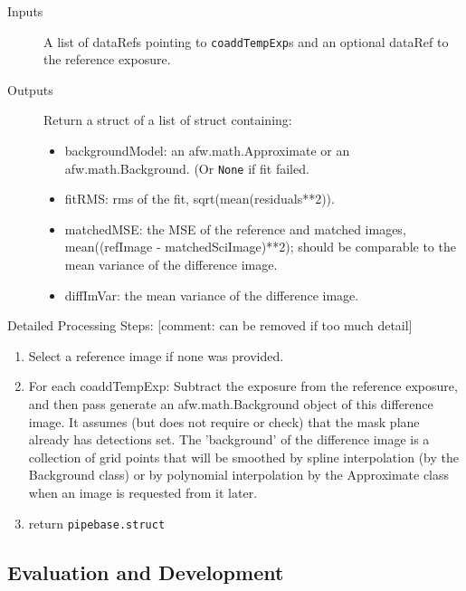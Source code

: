 \documentclass[12pt]{article}
\newcommand{\comment}[1]{{\color{cyan} [{comment: #1}]}}
\begin{document}
\begin{description}
\item[Inputs] A list of dataRefs  pointing to {\tt coaddTempExp}s and an optional dataRef to the reference exposure. 
\item[Outputs]  Return a struct of a list of struct containing:
\begin{itemize}
\item backgroundModel: an afw.math.Approximate or an afw.math.Background. (Or {\tt None} if fit failed. 
\item fitRMS: rms of the fit,  sqrt(mean(residuals**2)).
\item matchedMSE: the MSE of the reference and matched images, mean((refImage - matchedSciImage)**2);   should be comparable to the mean variance of the difference image.
\item  diffImVar: the mean variance of the difference image.
\end {itemize}
\end{description}

Detailed Processing Steps: \comment{can be removed if too much detail}
\begin{enumerate}
\item Select a reference image if none was provided.
\item  For each coaddTempExp:  
Subtract the exposure from the reference exposure, and then pass generate an afw.math.Background object of this difference image. It assumes (but does not require or check) that the mask plane already has detections set.  The 'background' of the difference image is a collection of grid points that will be smoothed by spline interpolation (by the Background class)  or by polynomial interpolation by the Approximate class when an image is requested from it later. 
\item return {\tt pipebase.struct}
\end{enumerate}

\subsection{Evaluation and Development}
\end{document}
